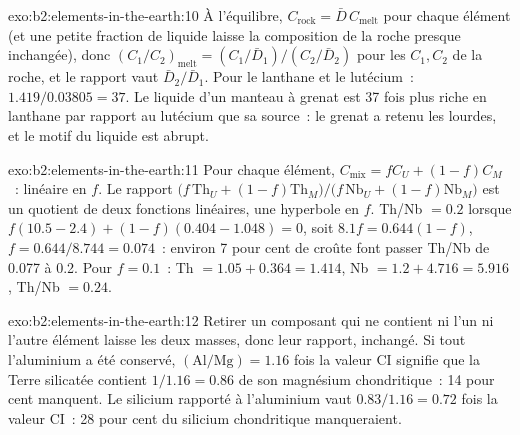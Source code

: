 \begin{solution}{exo:b2:elements-in-the-earth:10}
À l'équilibre, $C_{\mathrm{rock}} = \bar D\,C_{\mathrm{melt}}$ pour chaque élément (et une petite fraction de liquide
laisse la composition de la roche presque inchangée), donc $(C_1/C_2)_{\mathrm{melt}} = (C_{1}/\bar D_1)/(C_{2}/\bar D_2)$ pour les $C_1,
C_2$ de la roche, et le rapport vaut $\bar D_2/\bar D_1$.
Pour le lanthane et le lutécium~: $1.419/0.03805 = 37$.
Le liquide d'un manteau à grenat est 37 fois plus riche en lanthane par rapport au lutécium que sa source~:
le grenat a retenu les  lourdes, et le motif du liquide est abrupt.
\end{solution}

\begin{solution}{exo:b2:elements-in-the-earth:11}
Pour chaque élément, $C_{\mathrm{mix}} = fC_U + (1-f)C_M$~: linéaire en $f$.
Le rapport $\bigl(f\,\mathrm{Th}_U + (1-f)\mathrm{Th}_M\bigr)/\bigl(f\,\mathrm{Nb}_U +
(1-f)\mathrm{Nb}_M\bigr)$ est un quotient de deux fonctions linéaires,
une hyperbole en $f$. Th/Nb $= 0.2$ lorsque $f(10.5-2.4) + (1-f)(0.404-1.048) = 0$, soit $8.1f = 0.644(1-f)$,
$f = 0.644/8.744 = 0.074$~: environ 7 pour cent de croûte font passer Th/Nb de 0.077 à 0.2.
Pour $f = 0.1$~: Th $= 1.05 + 0.364 = 1.414$, Nb $= 1.2 + 4.716 = 5.916$, Th/Nb $= 0.24$.
\end{solution}

\begin{solution}{exo:b2:elements-in-the-earth:12}
Retirer un composant qui ne contient ni l'un ni l'autre élément laisse les deux masses, donc
leur rapport, inchangé. Si tout l'aluminium a été conservé, $(\mathrm{Al}/\mathrm{Mg}) = 1.16$
fois la valeur CI signifie que la Terre silicatée contient $1/1.16 = 0.86$ de son
magnésium chondritique~: 14 pour cent manquent. Le silicium rapporté à l'aluminium vaut
$0.83/1.16 = 0.72$ fois la valeur CI~: 28 pour cent du silicium chondritique manqueraient.
\end{solution}

